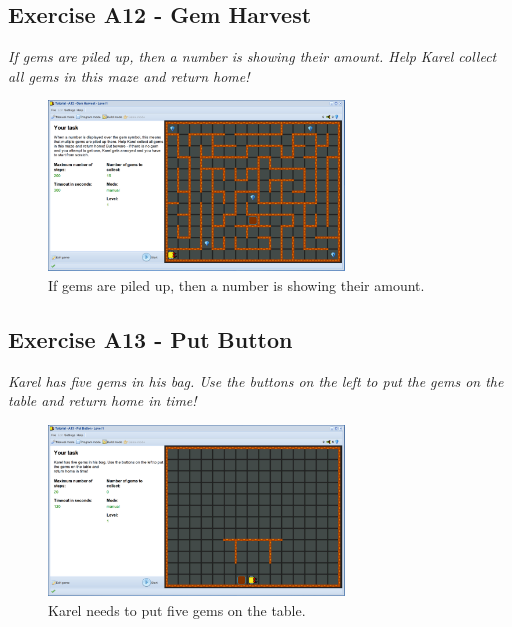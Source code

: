 \documentclass[article,A4,12pt]{llncs}
\begin{document}
\subsection{Exercise A12 - Gem Harvest}

{\em If gems are piled up, then a number is showing their amount. 
Help Karel collect all gems in this maze and return home!}\\[-7mm]

\begin{figure}[!ht]
\begin{center}
\includegraphics[width=0.7\textwidth]{img/a12.png}
\end{center}
\vspace{-4mm}
\caption{If gems are piled up, then a number is showing their amount.}
\label{fig:a12}
\vspace{-4mm}
\end{figure}
\noindent


\subsection{Exercise A13 - Put Button}

{\em Karel has five gems in his bag. Use the buttons on the left to put the gems on the table and 
return home in time!}\\[-7mm]

\begin{figure}[!ht]
\begin{center}
\includegraphics[width=0.7\textwidth]{img/a13.png}
\end{center}
\vspace{-4mm}
\caption{Karel needs to put five gems on the table.}
\label{fig:a13}
\vspace{-4mm}
\end{figure}
\noindent
\newpage
\end{document}
